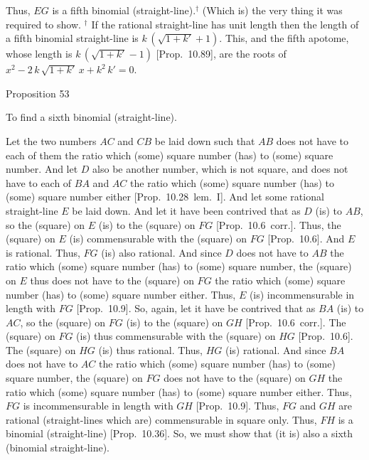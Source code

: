  Thus, $EG$ is a fifth binomial (straight-line).$^\dag$  (Which is) the very thing it
 was required to show.
{\footnotesize\noindent $^\dag$ If the rational straight-line has unit length then the length of a fifth binomial straight-line
is  $k\,(\sqrt{1+k'}+1)$. This, and the fifth apotome,
whose length is $k\,(\sqrt{1+k'}-1)$ [Prop.~10.89],
are the roots of $x^2- 2\,k\,\sqrt{1+k'}\,x+k^2\,k'=0$.}
 

\begin{center}
{\large Proposition 53}
\end{center}

To find a sixth binomial (straight-line).

\centerline{}

Let the two numbers $AC$ and $CB$ be laid down such that $AB$ does
not have to each of them the ratio which (some) square number (has) to (some) square number.  And let $D$  also be another number, which is not
square, and does not have to each of $BA$ and $AC$ the ratio which (some)
square number (has) to (some) square number either [Prop.~10.28~lem.~I]. And let some rational straight-line $E$ be laid down. And let it have been contrived that as $D$ (is) to
$AB$, so the (square) on $E$ (is) to the (square) on $FG$ [Prop.~10.6~corr.].  Thus, the (square) on $E$
(is) commensurable with the (square) on $FG$ [Prop.~10.6]. And $E$ is rational. Thus, $FG$
(is) also rational.  And since $D$ does not have to $AB$ the ratio
which (some) square number (has) to (some) square number, the (square) on $E$ thus does not have to the (square) on $FG$ the ratio which (some) square number (has) to (some) square number either. Thus, $E$ (is) incommensurable in length with $FG$ [Prop.~10.9].
So, again, let it have be contrived that as $BA$ (is) to $AC$, so the (square)
on $FG$ (is) to the (square) on $GH$ [Prop.~10.6~corr.]. The (square) on $FG$ (is)
thus commensurable with the (square) on $HG$ [Prop.~10.6].
 The (square) on $HG$ (is) thus rational.  Thus, $HG$ (is) rational. And since $BA$ does not have to
$AC$ the ratio which (some) square number (has) to (some) square number,
the (square) on $FG$ does not have to the (square) on $GH$ the
ratio which (some) square number (has) to (some) square number either.
Thus, $FG$ is incommensurable in length with $GH$ [Prop.~10.9]. Thus, $FG$ and $GH$ are rational (straight-lines which are) commensurable in square only. Thus, $FH$
is a binomial (straight-line) [Prop.~10.36]. So,
we must show that (it is) also a sixth (binomial straight-line).

